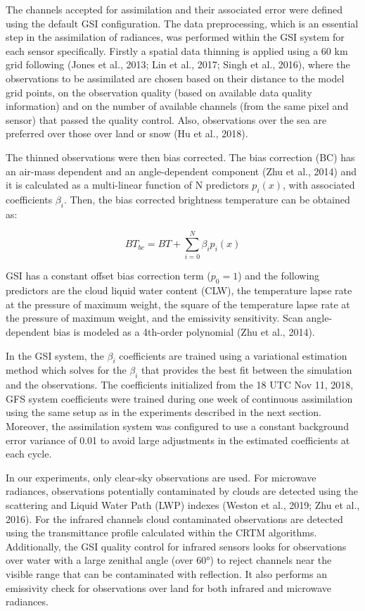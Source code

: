 \documentclass[final,5p,times,twocolumn,authoryear]{elsarticle} %
\begin{document}
The channels accepted for assimilation and their associated error were defined using the default GSI configuration. The data preprocessing, which is an essential step in the assimilation of radiances, was performed within the GSI system for each sensor specifically. Firstly a spatial data thinning is applied using a 60 km grid following (Jones et al., 2013; Lin et al., 2017; Singh et al., 2016), where the observations to be assimilated are chosen based on their distance to the model grid points, on the observation quality (based on available data quality information) and on the number of available channels (from the same pixel and sensor) that passed the quality control. Also, observations over the sea are preferred over those over land or snow (Hu et al., 2018).

The thinned observations were then bias corrected. The bias correction (BC) has an air-mass dependent and an angle-dependent component (Zhu et al., 2014) and it is calculated as a multi-linear function of N predictors \(p_i(x)\), with associated coefficients \(\beta_i\). Then, the bias corrected brightness temperature can be obtained as:

\[\mathit{BT_{bc}} =\mathit{ BT} + \sum_{i = 0}^{N} \beta_i p_i (x)\]

GSI has a constant offset bias correction term (\(p_0 = 1\)) and the following predictors are the cloud liquid water content (CLW), the temperature lapse rate at the pressure of maximum weight, the square of the temperature lapse rate at the pressure of maximum weight, and the emissivity sensitivity. Scan angle-dependent bias is modeled as a 4th-order polynomial (Zhu et al., 2014).

In the GSI system, the \(\beta_i\) coefficients are trained using a variational estimation method which solves for the \(\beta_i\) that provides the best fit between the simulation and the observations. The coefficients initialized from the 18 UTC Nov 11, 2018, GFS system coefficients were trained during one week of continuous assimilation using the same setup as in the experiments described in the next section. Moreover, the assimilation system was configured to use a constant background error variance of 0.01 to avoid large adjustments in the estimated coefficients at each cycle.

In our experiments, only clear-sky observations are used. For microwave radiances, observations potentially contaminated by clouds are detected using the scattering and Liquid Water Path (LWP) indexes (Weston et al., 2019; Zhu et al., 2016). For the infrared channels cloud contaminated observations are detected using the transmittance profile calculated within the CRTM algorithms. Additionally, the GSI quality control for infrared sensors looks for observations over water with a large zenithal angle (over 60°) to reject channels near the visible range that can be contaminated with reflection. It also performs an emissivity check for observations over land for both infrared and microwave radiances.
\end{document}
